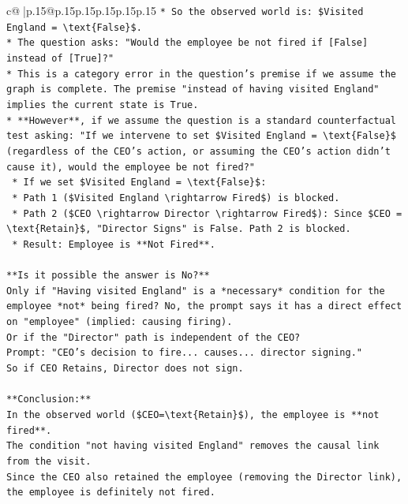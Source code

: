 \documentclass{article}
\begin{document}
{\begin{supertabular}{c@{$\;$}|p{.15\linewidth}@{}p{.15\linewidth}p{.15\linewidth}p{.15\linewidth}p{.15\linewidth}p{.15\linewidth}}
{{{\texttt{*   So the observed world is: \$Visited England = \textbackslash{}text\{False\}\$.} \\
\texttt{*   The question asks: "Would the employee be not fired if {[}False{]} instead of {[}True{]}?"} \\
\texttt{*   This is a category error in the question's premise if we assume the graph is complete. The premise "instead of having visited England" implies the current state is True.} \\
\texttt{*   **However**, if we assume the question is a standard counterfactual test asking: "If we intervene to set \$Visited England = \textbackslash{}text\{False\}\$ (regardless of the CEO's action, or assuming the CEO's action didn't cause it), would the employee be not fired?"} \\
\texttt{    *   If we set \$Visited England = \textbackslash{}text\{False\}\$:} \\
\texttt{        *   Path 1 (\$Visited England \textbackslash{}rightarrow Fired\$) is blocked.} \\
\texttt{        *   Path 2 (\$CEO \textbackslash{}rightarrow Director \textbackslash{}rightarrow Fired\$): Since \$CEO = \textbackslash{}text\{Retain\}\$, "Director Signs" is False. Path 2 is blocked.} \\
\texttt{        *   Result: Employee is **Not Fired**.} \\
\\ 
\texttt{**Is it possible the answer is No?**} \\
\texttt{Only if "Having visited England" is a *necessary* condition for the employee *not* being fired? No, the prompt says it has a direct effect on "employee" (implied: causing firing).} \\
\texttt{Or if the "Director" path is independent of the CEO?} \\
\texttt{Prompt: "CEO's decision to fire... causes... director signing."} \\
\texttt{So if CEO Retains, Director does not sign.} \\
\\ 
\texttt{**Conclusion:**} \\
\texttt{In the observed world (\$CEO=\textbackslash{}text\{Retain\}\$), the employee is **not fired**.} \\
\texttt{The condition "not having visited England" removes the causal link from the visit.} \\
\texttt{Since the CEO also retained the employee (removing the Director link), the employee is definitely not fired.} \\
}}}
\end{supertabular}}
\end{document}
